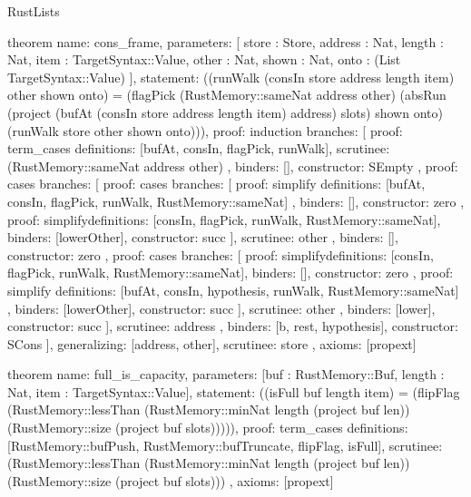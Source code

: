 \begin{lexlean}{RustLists}
\begin{semanticmodule}
theorem{
  name: cons_frame,
  parameters: [
    store : Store,
    address : Nat,
    length : Nat,
    item : TargetSyntax::Value,
    other : Nat,
    shown : Nat,
    onto : (List TargetSyntax::Value)
  ],
  statement: ((runWalk (consIn store address length item) other shown onto) = (flagPick (RustMemory::sameNat address other) (absRun (project (bufAt (consIn store address length item) address) slots) shown onto) (runWalk store other shown onto))),
  proof: induction{
    branches: [
      {
        proof: term_cases{
          definitions: [bufAt, consIn, flagPick, runWalk],
          scrutinee: (RustMemory::sameNat address other)
        },
        binders: [],
        constructor: SEmpty
      },
      {
        proof: cases{
          branches: [
            {
              proof: cases{
                branches: [
                  {
                    proof: simplify{
                      definitions: [bufAt, consIn, flagPick, runWalk, RustMemory::sameNat]
                    },
                    binders: [],
                    constructor: zero
                  },
                  {
                    proof: simplify{definitions: [consIn, flagPick, runWalk, RustMemory::sameNat]},
                    binders: [lowerOther],
                    constructor: succ
                  }
                ],
                scrutinee: other
              },
              binders: [],
              constructor: zero
            },
            {
              proof: cases{
                branches: [
                  {
                    proof: simplify{definitions: [consIn, flagPick, runWalk, RustMemory::sameNat]},
                    binders: [],
                    constructor: zero
                  },
                  {
                    proof: simplify{
                      definitions: [bufAt, consIn, hypothesis, runWalk, RustMemory::sameNat]
                    },
                    binders: [lowerOther],
                    constructor: succ
                  }
                ],
                scrutinee: other
              },
              binders: [lower],
              constructor: succ
            }
          ],
          scrutinee: address
        },
        binders: [b, rest, hypothesis],
        constructor: SCons
      }
    ],
    generalizing: [address, other],
    scrutinee: store
  },
  axioms: [propext]
}

theorem{
  name: full_is_capacity,
  parameters: [buf : RustMemory::Buf, length : Nat, item : TargetSyntax::Value],
  statement: ((isFull buf length item) = (flipFlag (RustMemory::lessThan (RustMemory::minNat length (project buf len)) (RustMemory::size (project buf slots))))),
  proof: term_cases{
    definitions: [RustMemory::bufPush, RustMemory::bufTruncate, flipFlag, isFull],
    scrutinee: (RustMemory::lessThan (RustMemory::minNat length (project buf len)) (RustMemory::size (project buf slots)))
  },
  axioms: [propext]
}


\end{semanticmodule}
\end{lexlean}

